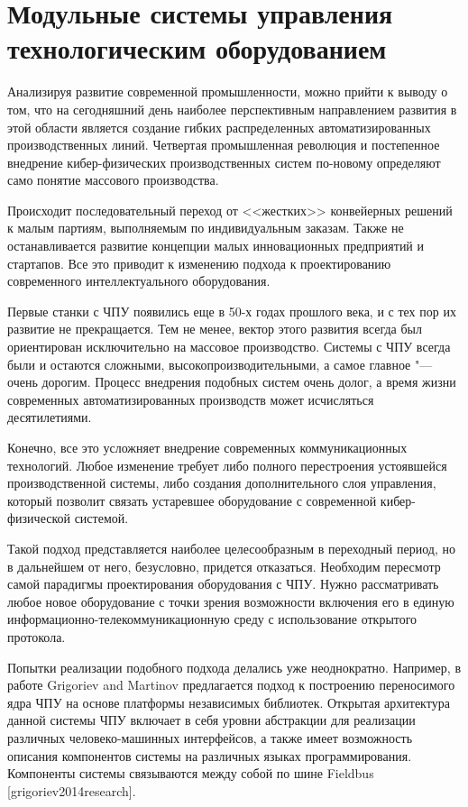 \section{Модульные системы управления технологическим оборудованием}\label{sec:ch1/sec2}

Анализируя развитие современной промышленности, можно прийти к выводу о том, что на сегодняшний день наиболее перспективным направлением развития в этой области является создание гибких распределенных автоматизированных производственных линий. Четвертая промышленная революция и постепенное внедрение кибер-физических производственных систем по-новому определяют само понятие массового производства.

Происходит последовательный переход от <<жестких>> конвейерных решений к малым партиям, выполняемым по индивидуальным заказам. Также не останавливается развитие  концепции малых инновационных предприятий и стартапов. Все это приводит к изменению подхода к проектированию современного интеллектуального оборудования. 

Первые станки с ЧПУ появились еще в 50-х годах прошлого века, и с тех пор их развитие не прекращается. Тем не менее, вектор этого развития всегда был ориентирован исключительно на массовое производство. Системы с ЧПУ всегда были и остаются сложными, высокопроизводительными, а самое главное "--- очень дорогим. Процесс внедрения подобных систем очень долог, а время жизни современных автоматизированных производств может исчисляться десятилетиями.

Конечно, все это усложняет внедрение современных коммуникационных технологий. Любое изменение требует либо полного перестроения устоявшейся производственной системы, либо создания дополнительного слоя управления, который позволит связать устаревшее оборудование с современной кибер-физической системой.

Такой подход представляется наиболее целесообразным в переходный период, но в дальнейшем от него, безусловно, придется отказаться. Необходим пересмотр самой парадигмы проектирования оборудования с ЧПУ. Нужно рассматривать любое новое оборудование с точки зрения возможности включения его в единую информационно-телекоммуникационную среду с использование открытого протокола.

Попытки реализации подобного подхода делались уже неоднократно. Например, в работе Grigoriev and Martinov предлагается подход к построению переносимого ядра ЧПУ на основе платформы независимых библиотек. Открытая архитектура данной системы ЧПУ включает в себя уровни абстракции для реализации различных человеко-машинных интерфейсов, а также имеет возможность описания компонентов системы на различных языках программирования. Компоненты системы связываются между собой по шине Fieldbus [grigoriev2014research].

